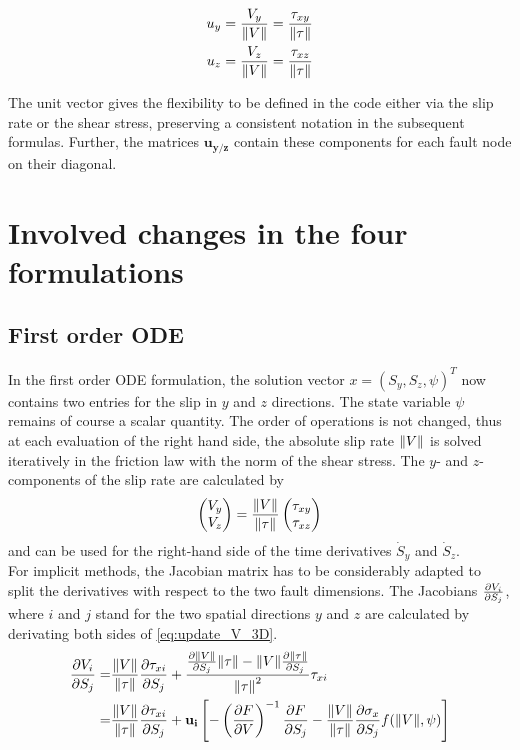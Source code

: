 \begin{align}
	u_y &= \frac{V_y}{\norm{V}} = \frac{\tau_{xy}}{\norm{\tau}} \\
	u_z &= \frac{V_z}{\norm{V}} = \frac{\tau_{xz}}{\norm{\tau}}
\end{align}

The unit vector gives the flexibility to be defined in the code either via the slip rate or the shear stress, preserving a consistent notation in the subsequent formulas. Further, the matrices $\mathbf{u_{y/z}}$ contain these components for each fault node on their diagonal. 
 
\section{Involved changes in the four formulations}
\subsection{First order ODE}
In the first order ODE formulation, the solution vector $x = (S_y, S_z, \psi)^T$ now contains two entries for the slip in $y$ and $z$ directions. The state variable $\psi$ remains of course a scalar quantity. The order of operations is not changed, thus at each evaluation of the right hand side, the absolute slip rate $\norm{V}$ is solved iteratively in the friction law with the norm of the shear stress. The $y$- and $z$-components of the slip rate are calculated by 
\begin{equation}
	\label{eq:update_V_3D}
	\begin{pmatrix}
		V_y \\ V_z
	\end{pmatrix} = \frac{\norm{V}}{\norm{\tau}} \begin{pmatrix}
													\tau_{xy} \\ \tau_{xz}
												 \end{pmatrix}
\end{equation}
and can be used for the right-hand side of the time derivatives $\dot{S}_y$ and $\dot{S}_z$. \\
For implicit methods, the Jacobian matrix has to be considerably adapted to split the derivatives with respect to the two fault dimensions. The Jacobians $\pdv{V_i}{S_j}$, where $i$ and $j$ stand for the two spatial directions $y$ and $z$ are calculated by derivating both sides of \autoref{eq:update_V_3D}.
\begin{align}
	\pdv{V_i}{S_j} =& \frac{\norm{V}}{\norm{\tau}}\pdv{\tau_{xi}}{S_j} + \frac{\pdv{\norm{V}}{S_j}\norm{\tau}-\norm{V}\pdv{\norm{\tau}}{S_j}}{\norm{\tau}^2}\tau_{xi} \nonumber\\ 
	=& \frac{\norm{V}}{\norm{\tau}}\pdv{\tau_{xi}}{S_j} + \mathbf{u_i}\left[-\left(\pdv{F}{V}\right)^{-1}\pdv{F}{S_j} - \frac{\norm{V}}{\norm{\tau}}\pdv{\sigma_{x}}{S_j}f(\norm{V},\psi)\right] 
	\label{eq:partial_V_S_Elasticity_3D}
\end{align}
